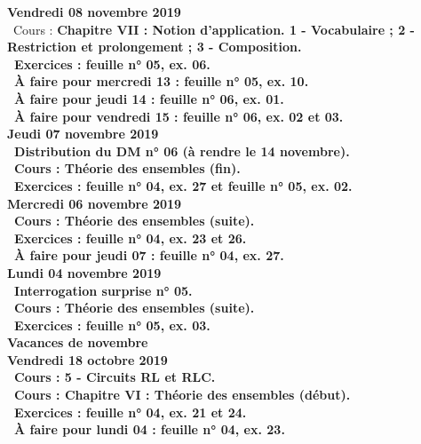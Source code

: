 \documentclass[12pt,a4paper]{article}
\begin{document}
\noindent\textbf{Vendredi 08 novembre 2019}\\
\bu\ Cours : \bf Chapitre VII \rm : Notion d'application. 1 - Vocabulaire ; 2 - Restriction et prolongement ; 3 - Composition.\\
\bu\ Exercices : feuille n° 05, ex. 06.\\
\bu\ À faire pour mercredi 13 : feuille n° 05, ex. 10.\\
\bu\ À faire pour jeudi 14 : feuille n° 06, ex. 01.\\
\bu\ À faire pour vendredi 15 : feuille n° 06, ex. 02 et 03.\vspace{.4cm}\\

\noindent\textbf{Jeudi 07 novembre 2019}\\
\bu\ Distribution du DM n° 06 (à rendre le 14 novembre).\\
\bu\ Cours : Théorie des ensembles (fin).\\
\bu\ Exercices : feuille n° 04, ex. 27 et feuille n° 05, ex. 02.\vspace{.4cm}\\

\noindent\textbf{\bf Mercredi 06 novembre 2019}\\
\bu\ Cours : Théorie des ensembles (suite).\\
\bu\ Exercices : feuille n° 04, ex. 23 et 26.\\
\bu\ À faire pour jeudi 07 : feuille n° 04, ex. 27.\vspace{.4cm}\\
 
\noindent\textbf{Lundi 04 novembre 2019}\\
\bu\ Interrogation surprise n° 05.\\
\bu\ Cours : Théorie des ensembles (suite).\\
\bu\ Exercices : feuille n° 05, ex. 03.\vspace{.4cm}\\
 
\noindent\textbf{ Vacances de novembre }\vspace{.4cm}\\
 
\noindent\textbf{Vendredi 18 octobre 2019}\\
\bu\ Cours : 5 - Circuits RL et RLC.\\
\bu\ Cours : \bf Chapitre VI \rm : Théorie des ensembles (début).\\
\bu\ Exercices : feuille n° 04, ex. 21 et 24.\\
\bu\ À faire pour lundi 04 : feuille n° 04, ex. 23.\vspace{.4cm}\\
\end{document}
